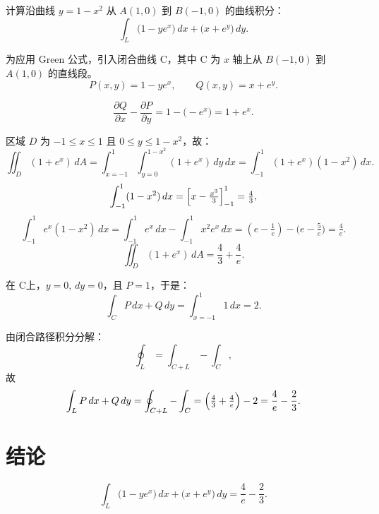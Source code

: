 \documentclass[12pt]{ctexart}
\begin{document}
计算沿曲线 $y=1-x^2$ 从 $A(1,0)$ 到 $B(-1,0)$ 的曲线积分：
\[
\int_L \bigl(1 - ye^x\bigr)\,dx + \bigl(x + e^y\bigr)\,dy.
\]

为应用 Green 公式，引入闭合曲线 C，其中 C 为 $x$ 轴上从 $B(-1,0)$ 到 $A(1,0)$ 的直线段。
\[
P(x,y)=1 - ye^x,\qquad Q(x,y)=x + e^y.
\]

\[
\frac{\partial Q}{\partial x}-\frac{\partial P}{\partial y}
=1 - \bigl(-e^x\bigr)
=1 + e^x.
\]


区域 $D$ 为 $-1\le x\le1$ 且 $0\le y\le1-x^2$，故：
\[
\iint_D(1+e^x)\,dA
=\int_{x=-1}^{1}\int_{y=0}^{1-x^2}(1+e^x)\,dy\,dx
=\int_{-1}^1(1+e^x)(1-x^2)\,dx.
\]
\[
\int_{-1}^1(1-x^2)\,dx=\Bigl[x-\tfrac{x^3}{3}\Bigr]_{-1}^1=\tfrac{4}{3},
\]
\[
\int_{-1}^1 e^x(1-x^2)\,dx
=\int_{-1}^1e^x\,dx - \int_{-1}^1 x^2e^x\,dx
=(e-\tfrac1e)-\bigl(e-\tfrac{5}{e}\bigr)=\tfrac{4}{e}.
\]
\[
\iint_D(1+e^x)\,dA=\frac{4}{3}+\frac{4}{e}.
\]

在 C上，$y=0,\,dy=0$，且 $P=1$，于是：
\[
\int_{C}P\,dx+Q\,dy=\int_{x=-1}^{1}1\,dx=2.
\]

由闭合路径积分分解：
\[
\oint_L=\int_{C+L}-\int_{C},
\]
故
\[
\int_L P\,dx+Q\,dy=\oint_{C+L}-\int_{C}
=\Bigl(\tfrac{4}{3}+\tfrac{4}{e}\Bigr)-2
=\frac{4}{e}-\frac{2}{3}.
\]

\section*{结论}
\[
\boxed{\int_L\bigl(1-ye^x\bigr)\,dx+\bigl(x+e^y\bigr)\,dy = \frac{4}{e}-\frac{2}{3}.}
\]
\end{document}
